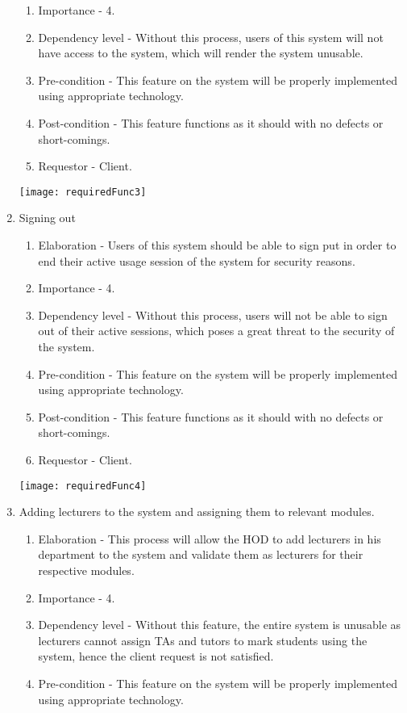 \documentclass[12pt, a4paper]{scrartcl}
\begin{document}
\begin{enumerate}
\begin{enumerate}
						\item Importance - 4.
						\item Dependency level - Without this process, users of this system will not have access to the system, which will render the system unusable.
						\item Pre-condition - This feature on the system will be properly implemented using appropriate technology.
						\item Post-condition - This feature functions as it should with no defects or short-comings.
						\item Requestor - Client.
					\end{enumerate}
					\texttt{[image: requiredFunc3]}
					\item Signing out
					\begin{enumerate}
						\item Elaboration - Users of this system should be able to sign put in order to end their active usage session of the system for security reasons.
						\item Importance - 4.
						\item Dependency level - Without this process, users will not be able to sign out of their active sessions, which poses a great threat to the security of the system.
						\item Pre-condition - This feature on the system will be properly implemented using appropriate technology.
						\item Post-condition - This feature functions as it should with no defects or short-comings.
						\item Requestor - Client.
					\end{enumerate}
					\texttt{[image: requiredFunc4]}
					\item Adding lecturers to the system and assigning them to relevant modules.
					\begin{enumerate}
						\item Elaboration - This process will allow the HOD to add lecturers in his department to the system and validate them as lecturers for their respective modules.
						\item Importance - 4.
						\item Dependency level - Without this feature, the entire system is unusable as lecturers cannot assign TAs and tutors to mark students using the system, hence the client request is not satisfied.
						\item Pre-condition - This feature on the system will be properly implemented using appropriate technology.

\end{enumerate}
\end{enumerate}
\end{document}
